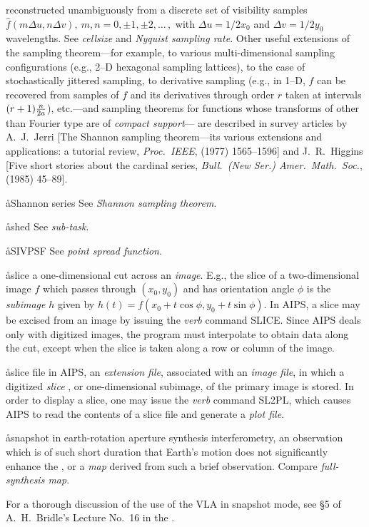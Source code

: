 reconstructed unambiguously from a discrete set of visibility samples
$\hat f(m\Delta u,n\Delta v),\ {m,n}=0,\pm1,\pm2,\ldots\,,$
with $\Delta u=1/2x_0$ and $\Delta v=1/2y_0$ wavelengths.
See {\it cellsize} and {\it Nyquist sampling rate}.
Other useful extensions of the sampling theorem---for example,
to various multi-dimensional sampling configurations (e.g., 2--D
hexagonal sampling lattices), to the case of stochastically jittered sampling,
to derivative sampling (e.g., in 1--D, $f$ can be recovered from samples of $f$
and its derivatives through order $r$ taken at intervals $(r+1){n\over2a}$),
etc.---and sampling theorems for functions whose transforms of other
than Fourier type are of {\it compact support}\/---%
are described in survey articles by A.~J.~Jerri
[The Shannon sampling theorem---its various extensions and applications:
a tutorial review, {\it Proc.~IEEE},  (1977) 1565--1596]
and J.~R.~Higgins [Five short stories about the cardinal series,
{\it Bull.\ (New Ser.) Amer.\ Math.\ Soc.},  (1985) 45--89].

\aa{Shannon series}
See {\it Shannon sampling theorem}.

\aa{shed} See {\it sub-task}.

\aa{SIVPSF} See {\it point spread function}.

\aa{slice}
a one-dimensional cut across an {\it image}.
E.g., the slice of a two-dimensional image $f$
which passes through $(x_0,y_0)$ and has orientation angle $\phi$
is the {\it subimage} $h$ given by $h(t)=f(x_0+t\cos\phi,y_0+t\sin\phi)$.
In AIPS, a slice may be excised from an image
by issuing the {\it verb} command SLICE.
Since AIPS deals only with digitized images, the program must
interpolate to obtain data along the cut,
except when the slice is taken along a row or column of the image.

\aa{slice file}
in AIPS, an {\it extension file}, associated with an {\it image file},
in which a digitized {\it slice} \qv, or one-dimensional subimage, of the
primary image is stored.
In order to display a slice, one may issue the {\it verb}
command SL2PL, which causes AIPS to read the contents of a slice file
and generate a {\it plot file}.

\aa{snapshot}
in earth-rotation aperture synthesis interferometry,
an observation which is of such short duration that Earth's motion
does not significantly enhance the ,
or a {\it map} derived from such a brief observation.
Compare {\it full-synthesis map}.
\par
For a thorough discussion of the use of the VLA in snapshot mode,
see \S 5 of A.~H.~Bridle's Lecture No.~16 in the \ssp.

